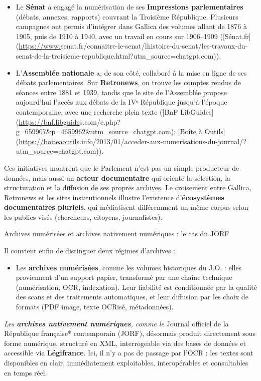 \begin{itemize}
\item Le \textbf{Sénat} a engagé la numérisation de ses \textbf{Impressions parlementaires} (débats, annexes, rapports) couvrant la Troisième République. Plusieurs campagnes ont permis d’intégrer dans Gallica des volumes allant de 1876 à 1905, puis de 1910 à 1940, avec un travail en cours sur 1906–1909 ([Sénat.fr](\url{https://www.}senat.fr/connaitre-le-senat/lhistoire-du-senat/les-travaux-du-senat-de-la-troisieme-republique.html?utm_source=chatgpt.com)).
\item L’\textbf{Assemblée nationale} a, de son côté, collaboré à la mise en ligne de ses débats parlementaires. Sur \textbf{Retronews}, on trouve les comptes rendus de séances entre 1881 et 1939, tandis que le site de l’Assemblée propose aujourd’hui l’accès aux débats de la IVᵉ République jusqu’à l’époque contemporaine, avec une recherche plein texte ([BnF LibGuides](\url{https://bnf.libguide}s.com/c.php?g=659907&p=4659962&utm_source=chatgpt.com); [Boîte à Outils](\url{https://boiteaoutil}s.info/2013/01/acceder-aux-numerisations-du-journal/?utm_source=chatgpt.com)).

\end{itemize}
Ces initiatives montrent que le Parlement n’est pas un simple producteur de données, mais aussi un \textbf{acteur documentaire} qui oriente la sélection, la structuration et la diffusion de ses propres archives. Le croisement entre Gallica, Retronews et les sites institutionnels illustre l’existence d’\textbf{écosystèmes documentaires pluriels}, qui médiatisent différemment un même corpus selon les publics visés (chercheurs, citoyens, journalistes).









 Archives numérisées et archives nativement numériques : le cas du JORF

Il convient enfin de distinguer deux régimes d’archives :

\begin{itemize}
\item Les \textbf{archives numérisées}, comme les volumes historiques du J.O. : elles proviennent d’un support papier, transformé par une chaîne technique (numérisation, OCR, indexation). Leur fiabilité est conditionnée par la qualité des scans et des traitements automatiques, et leur diffusion par les choix de formats (PDF image, texte OCRisé, métadonnées).
\end{itemize}
\emph{ Les \textbf{archives nativement numériques}, comme le }Journal officiel de la République française* contemporain (JORF), désormais produit directement sous forme numérique, structuré en XML, interrogeable via des bases de données et accessible via \textbf{Légifrance}. Ici, il n’y a pas de passage par l’OCR : les textes sont disponibles en clair, immédiatement exploitables, interopérables et consultables en temps réel.

